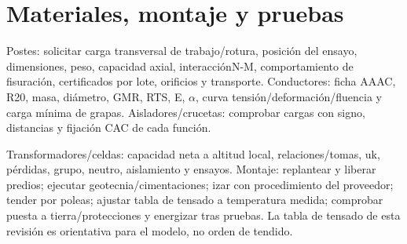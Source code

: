 \setcounter{section}{6}
\section{Materiales, montaje y pruebas}
Postes: solicitar carga transversal de trabajo/rotura, posición del ensayo, dimensiones, peso, capacidad axial, interacciónN-M, comportamiento de fisuración, certificados por lote, orificios y transporte. Conductores: ficha AAAC, R20, masa, diámetro, GMR, RTS, E, \ensuremath{\alpha}, curva tensión/deformación/fluencia y carga mínima de grapas. Aisladores/crucetas: comprobar cargas con signo, distancias y fijación CAC de cada función.

Transformadores/celdas: capacidad neta a altitud local, relaciones/tomas, uk, pérdidas, grupo, neutro, aislamiento y ensayos. Montaje: replantear y liberar predios; ejecutar geotecnia/cimentaciones; izar con procedimiento del proveedor; tender por poleas; ajustar tabla de tensado a temperatura medida; comprobar puesta a tierra/protecciones y energizar tras pruebas. La tabla de tensado de esta revisión es orientativa para el modelo, no orden de tendido.

